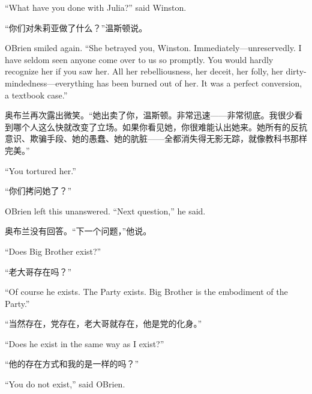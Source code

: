 \begin{paracol}{2}
\switchcolumn*

``What have you done with Julia?'' said Winston.

\switchcolumn

``你们对朱莉亚做了什么？''温斯顿说。

\switchcolumn*

O\textquotesingle Brien smiled again. ``She betrayed you, Winston.
Immediately---unreservedly. I have seldom seen anyone come over to us so
promptly. You would hardly recognize her if you saw her. All her
rebelliousness, her deceit, her folly, her dirty-mindedness---everything
has been burned out of her. It was a perfect conversion, a textbook
case.''

\switchcolumn

奥布兰再次露出微笑。``她出卖了你，温斯顿。非常迅速——非常彻底。我很少看到哪个人这么快就改变了立场。如果你看见她，你很难能认出她来。她所有的反抗意识、欺骗手段、她的愚蠢、她的肮脏——全都消失得无影无踪，就像教科书那样完美。''

\switchcolumn*

``You tortured her.''

\switchcolumn

``你们拷问她了？''

\switchcolumn*

O\textquotesingle Brien left this unanswered. ``Next question,'' he said.

\switchcolumn

奥布兰没有回答。``下一个问题，''他说。

\switchcolumn*

``Does Big Brother exist?''

\switchcolumn

``老大哥存在吗？''

\switchcolumn*

``Of course he exists. The Party exists. Big Brother is the embodiment of
the Party.''

\switchcolumn

``当然存在，党存在，老大哥就存在，他是党的化身。''

\switchcolumn*

``Does he exist in the same way as I exist?''

\switchcolumn

``他的存在方式和我的是一样的吗？''

\switchcolumn*

``You do not exist,'' said O\textquotesingle Brien.

\switchcolumn


\end{paracol}
